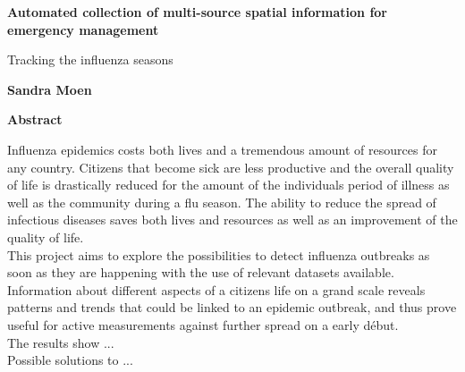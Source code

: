 \thispagestyle{plain}
\begin{center}
	\Large
	\textbf{Automated collection of multi-source spatial information for emergency management}
	
	\vspace{0.4cm}
	\large
	Tracking the influenza seasons
	
	\vspace{0.4cm}
	\textbf{Sandra Moen}
	
	\vspace{0.9cm}
	\textbf{Abstract}
\end{center}
Influenza epidemics costs both lives and a tremendous amount of resources for any country. Citizens that become sick are less productive and the overall quality of life is drastically reduced for the amount of the individuals period of illness as well as the community during a flu season. The ability to reduce the spread of infectious diseases saves both lives and resources as well as an improvement of the quality of life. \\

This project aims to explore the possibilities to detect influenza outbreaks as soon as they are happening with the use of relevant datasets available. Information about different aspects of a citizens life on a grand scale reveals patterns and trends that could be linked to an epidemic outbreak, and thus prove useful for active measurements against further spread on a early début. \\

The results show ...\\

Possible solutions to ...